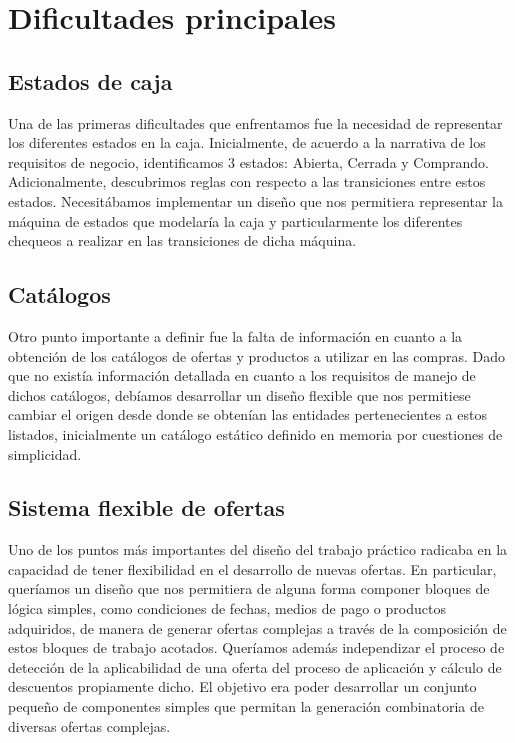 \documentclass[a4paper,11pt]{article}
\begin{document}
\section{Dificultades principales}

\subsection{Estados de caja}

Una de las primeras dificultades que enfrentamos fue la necesidad de
representar los diferentes estados en la caja. Inicialmente, de acuerdo a la
narrativa de los requisitos de negocio, identificamos 3 estados: Abierta,
Cerrada y Comprando. Adicionalmente, descubrimos reglas con respecto a las
transiciones entre estos estados. Necesitábamos implementar un diseño que nos
permitiera representar la máquina de estados que modelaría la caja y
particularmente los diferentes chequeos a realizar en las transiciones de dicha
máquina.

\subsection{Catálogos}

Otro punto importante a definir fue la falta de información en cuanto a la
obtención de los catálogos de ofertas y productos a utilizar en las compras.
Dado que no existía información detallada en cuanto a los requisitos de manejo
de dichos catálogos, debíamos desarrollar un diseño flexible que nos permitiese
cambiar el origen desde donde se obtenían las entidades pertenecientes a estos
listados, inicialmente un catálogo estático definido en memoria por cuestiones
de simplicidad.

\subsection{Sistema flexible de ofertas}

Uno de los puntos más importantes del diseño del trabajo práctico radicaba en
la capacidad de tener flexibilidad en el desarrollo de nuevas ofertas. En
particular, queríamos un diseño que nos permitiera de alguna forma componer
bloques de lógica simples, como condiciones de fechas, medios de pago o
productos adquiridos, de manera de generar ofertas complejas a través de la
composición de estos bloques de trabajo acotados. Queríamos además independizar
el proceso de detección de la aplicabilidad de una oferta del proceso de
aplicación y cálculo de descuentos propiamente dicho. El objetivo era poder
desarrollar un conjunto pequeño de componentes simples que permitan la
generación combinatoria de diversas ofertas complejas.
\end{document}
